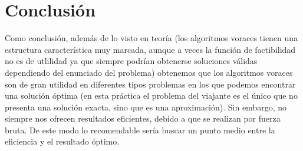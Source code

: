 \documentclass[11pt,openany]{book}
\begin{document}
\chapter{Conclusión}
Como conclusión, además de lo visto en teoría (los algoritmos voraces tienen una 
estructura característica muy marcada, aunque a veces la función de factibilidad 
no es de utlilidad ya que siempre podrían obtenerse soluciones válidas dependiendo 
del enunciado del problema) obtenemos que los algoritmos voraces son de gran 
utilidad en diferentes tipos problemas en los que podemos encontrar una solución 
óptima (en esta práctica el problema del viajante es el único que no presenta 
una solución exacta, sino que es una aproximación). Sin embargo, no siempre 
nos ofrecen resultados eficientes, debido a que se realizan por fuerza bruta. 
De este modo lo recomendable sería buscar un punto medio entre la eficiencia 
y el resultado óptimo.
\end{document}
